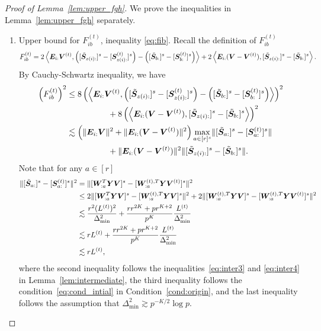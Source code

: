 \documentclass[lettersize,onecolumn,journal]{IEEEtran}
\theoremstyle{definition}
\theoremstyle{definition}
\newcommand{\of}[1]{\left(#1\right)}
\newcommand{\ang}[1]{\left\langle#1\right\rangle}
\begin{document}
\begin{proof}[Proof of Lemma~\ref{lem:upper_fgh}]
We prove the inequalities in Lemma~\ref{lem:upper_fgh} separately.
\begin{enumerate}
    \item Upper bound for $F_{ib}^{(t)}$, inequality \eqref{eq:fib}. Recall the definition of $F_{ib}^{(t)}$ 
    \begin{align}
         F_{ib}^{(t)} = 2 \ang{\mE_{i:} \mV^{(t)}, \of{ [ \tilde \mS_{z(i):} ]^s  - [\mS_{z(i):}^{(t)} ]^s  }  - \of{  [  \tilde \mS_{b:} ]^s  - [ \mS_{b:}^{(t)} ]^s  }  }  + 2 \ang{ \mE_{i:}(\mV - \mV^{(t)} ), [ \tilde \mS_{z(i):} ]^s - [ \tilde \mS_{b:} ]^s  }.
    \end{align}
    By Cauchy-Schwartz inequality, we have 
    \begin{align}
        \of{F_{ib}^{(t)}}^2 & \leq 8 \of{\ang{\mE_{i:} \mV^{(t)}, \of{ [  \tilde \mS_{z(i):} ]^s  -  [  \mS_{z(i):}^{(t)} ]^s  }  - \of{  [  \tilde \mS_{b:} ]^s  -  [  \mS_{b:}^{(t)} ]^s  }  }  }^2 \\
         & \quad \quad \quad \quad \quad + 8\of{ \ang{ \mE_{i:} (\mV - \mV^{(t)} ), [  \tilde \mS_{z(i):} ]^s - [ \tilde  \mS_{b:} ]^s  }}^2 \\
         & \lesssim \of{ \onormSize{}{\mE_{i:} \mV}^2 + \onormSize{}{\mE_{i:} ( \mV - \mV^{(t)} )}^2 } \max_{a \in [r]^s} \onormSize{}{  [  \tilde \mS_{a:} ]^s - [   \mS_{a:}^{(t)} ]^s  } \\
          & \quad \quad \quad \quad \quad +\onormSize{}{\mE_{i:} ( \mV - \mV^{(t)} )}^2  \onormSize{}{  [  \tilde \mS_{z(i):} ]^s - [  \tilde \mS_{b:} ]^s  }. \label{eq:fib_decomp}
    \end{align}
    Note that for any $a \in [r]$ 
    \begin{align}
        \onormSize{}{  [  \tilde \mS_{a:} ]^s - [   \mS_{a:}^{(t)} ]^s  }^2 &= \onormSize{}{ [ \mW_{:a}^T \mY \mV ]^s - [ \mW_{:a}^{(t),T} \mY \mV^{(t)} ]^s }^2 \\
        &\leq 2 \onormSize{}{ [ \mW_{:a}^T \mY \mV ]^s  - [ \mW_{:a}^{(t),T} \mY \mV ]^s  }^2 + 2 \onormSize{}{[ \mW_{:a}^{(t),T} \mY \mV ]^s - [ \mW_{:a}^{(t),T} \mY \mV^{(t)} ]^s }^2\\
        & \lesssim \frac{ r^2 (L^{(t)})^2}{ \Delta_{\min}^2} + \frac{ r r^{2K} + p r^{K+2}}{p^K} \frac{L^{(t)}}{\Delta_{\min}^2}\\
        & \lesssim r L^{(t)}+  \frac{ r r^{2K} + p r^{K+2}}{p^K} \frac{L^{(t)}}{\Delta_{\min}^2}\\
        & \lesssim r L^{(t)},\label{eq:fib_1}
    \end{align}
    where the second inequality follows the inequalities~\eqref{eq:inter3} and \eqref{eq:inter4} in Lemma~\ref{lem:intermediate}, the third inequality follows the condition~\eqref{eq:cond_intial} in Condition~\ref{cond:origin}, and the last inequality follows the assumption that $\Delta_{\min}^2 \gtrsim p^{-K/2}\log p$. 
    

\end{enumerate}
\end{proof}
\end{document}
